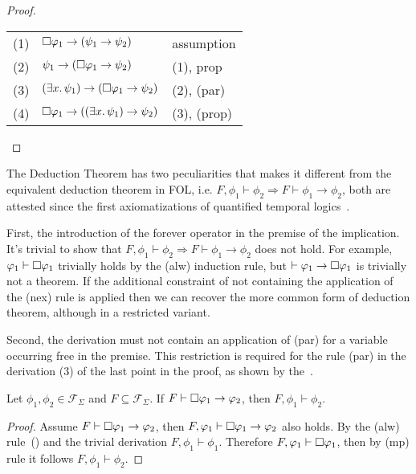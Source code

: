 \begin{proof}
\begin{enumerate}
      \begin{tabularx}{300pt}{cXl}
        (1) & $\Box{\varphi_1} \to (\psi_1 \to \psi_2)$ & assumption \\
        (2) & $\psi_1 \to (\Box{\varphi_1} \to \psi_2)$ & (1), prop \\
        (3) & $(\exists {x} \ldotp {\psi_1}) \to (\Box{\varphi_1} \to \psi_2)$ & (2), (par) \\
        (4) & $\Box{\varphi_1} \to ((\exists {x} \ldotp {\psi_1}) \to \psi_2)$ & (3), (prop) \\
      \end{tabularx}
  \end{enumerate}
\end{proof}

The Deduction Theorem has two peculiarities that makes it different from the equivalent deduction theorem in \ac{FOL},
i.e. $F, \phi_1 \vdash \phi_2 \Rightarrow F \vdash \phi_1 \to \phi_2$, both are attested since the first axiomatizations
of quantified temporal logics~\cite{kozen_verification_1982}.

First, the introduction of the forever operator in the premise of the implication. It's trivial to show that $F, \phi_1
\vdash \phi_2 \Rightarrow F \vdash \phi_1 \to \phi_2$ does not hold. For example, $\varphi_1 \vdash \Box{\varphi_1}$
trivially holds by the (alw) induction rule, but $\vdash \varphi_1 \to \Box{\varphi_1}$ is trivially not a theorem. If the
additional constraint of not containing the application of the (nex) rule is applied then we can recover the more common
form of deduction theorem, although in a restricted variant.

Second, the derivation must not contain an application of (par) for a variable occurring free in the premise.  This
restriction is required for the rule (par) in the derivation (3) of the last point in the proof, as shown by
the~.

\begin{theorem}
  Let $\phi_1, \phi_2 \in \mathcal{F}_\Sigma$ and $F \subseteq \mathcal{F}_\Sigma$. If $F \vdash \Box{\varphi_1} \to
  \varphi_2$, then $F, \phi_1 \vdash \phi_2$.
\end{theorem}
\begin{proof}
  Assume $F \vdash \Box{\varphi_1} \to \varphi_2$, then $F,\varphi_1 \vdash \Box{\varphi_1} \to \varphi_2$ also
  holds. By the (alw) rule~() and the trivial derivation $F, \phi_1 \vdash \phi_1$. Therefore
  $F, \varphi_1 \vdash \Box{\varphi_1}$, then by (mp) rule it follows $F, \phi_1 \vdash \phi_2$.
\end{proof}

